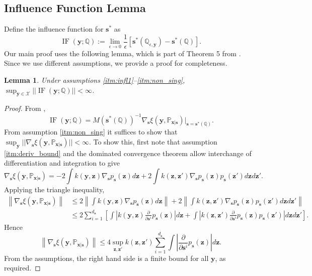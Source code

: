 \documentclass{article}
\theoremstyle{plain}
\newtheorem{lemma}[theorem]{Lemma}
\theoremstyle{definition}
\theoremstyle{remark}
\DeclareMathOperator*{\InF}{IF}
\begin{document}
\subsection{Influence Function Lemma}

Define the influence function for $\mathbf{s}^*$ as
\[
\InF(\mathbf{y}; \mathbb{Q})
:= \lim_{\epsilon \to 0} \frac{1}{\epsilon} [\mathbf{s}^*(\mathbb{Q}_{\epsilon, \mathbf{y}}) - \mathbf{s}^*(\mathbb{Q})].
\]
Our main proof uses the following lemma,
which is part of Theorem 5 from \citet{briolStatisticalInferenceGenerative2019b}.
Since we use different assumptions, we provide a proof for completeness.

\begin{lemma} \label{lem:s_influence}
  Under assumptions \ref{itm:infl1}--\ref{itm:non_sing},
  $\sup_{\mathbf{y} \in \mathcal{X}} || \InF(\mathbf{y}; \mathbb{Q}) || < \infty$.
\end{lemma}

\begin{proof}
  From \citet{dawid2014theory},
  \[
  \InF(\mathbf{y}; \mathbb{Q})
  = M(\mathbf{s}^*(\mathbb{Q}))^{-1} \nabla_\mathbf{s} \xi(\mathbf{y}, \mathbb{P}_{\mathbf{x}|\mathbf{s}}) \Big|_{\mathbf{s} = \mathbf{s}^*(\mathbb{Q})}.
  \]
  From assumption \ref{itm:non_sing} it suffices to show that $\sup_{\mathbf{y}} || \nabla_\mathbf{s} \xi(\mathbf{y}, \mathbb{P}_{\mathbf{x}|\mathbf{s}}) || < \infty$.
  To show this, first note that assumption \ref{itm:deriv_bound} and the dominated convergence theorem
  allow interchange of differentiation and integration to give
  \[
  \nabla_\mathbf{s} \xi(\mathbf{y}, \mathbb{P}_{\mathbf{x}|\mathbf{s}}) =
  - 2 \int k(\mathbf{y}, \mathbf{z}) \nabla_\mathbf{s} p_\mathbf{s}(\mathbf{z}) d\mathbf{z}
  + 2 \int k(\mathbf{z}, \mathbf{z}') \nabla_\mathbf{s} p_\mathbf{s}(\mathbf{z}) p_\mathbf{s}(\mathbf{z}') d\mathbf{z} d\mathbf{z}'.
  \]
  Applying the triangle inequality,
  \begin{align*}
  \left\| \nabla_\mathbf{s} \xi(\mathbf{y}, \mathbb{P}_{\mathbf{x}|\mathbf{s}}) \right\| & \leq
  2 \left\| \int k(\mathbf{y}, \mathbf{z}) \nabla_\mathbf{s} p_\mathbf{s}(\mathbf{z}) d\mathbf{z} \right\|
  + 2 \left\| \int k(\mathbf{z}, \mathbf{z}') \nabla_\mathbf{s} p_\mathbf{s}(\mathbf{z})  p_\mathbf{s}(\mathbf{z}') d\mathbf{z} d\mathbf{z}' \right\| \\
  & \leq 2 \sum_{i=1}^{d_\mathbf{s}} \left[ \int  \left| k(\mathbf{y}, \mathbf{z}) \frac{\partial}{\partial \mathbf{s}^i} p_\mathbf{s}(\mathbf{z}) \right| d\mathbf{z}
  + \int \left| k(\mathbf{z}, \mathbf{z}') \frac{\partial}{\partial \mathbf{s}^i} p_\mathbf{s}(\mathbf{z}) p_\mathbf{s}(\mathbf{z}') \right| d\mathbf{z} d\mathbf{z}' \right].
  \end{align*}
  Hence
  \[
  \left\| \nabla_\mathbf{s} \xi(\mathbf{y}, \mathbb{P}_{\mathbf{x}|\mathbf{s}}) \right\| \leq
  4 \sup_{\mathbf{z}, \mathbf{z}'} k(\mathbf{z}, \mathbf{z}') \sum_{i=1}^{d_\mathbf{s}} \int \left| \frac{\partial}{\partial \mathbf{s}^i} p_\mathbf{s}(\mathbf{z}) \right| d\mathbf{z}.
  \]
  From the assumptions, the right hand side is a finite bound for all $\mathbf{y}$, as required.
\end{proof}
\end{document}
